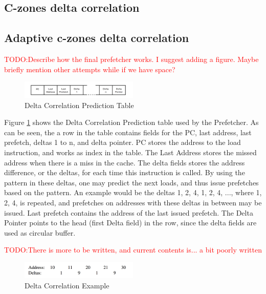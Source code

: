 \documentclass[a4paper]{IEEEtran}
\newcommand\TODO[1]{\textcolor{red}{TODO:#1}}
\newcommand\todo[1]{\TODO{#1}}
\begin{document}
\subsection{C-zones delta correlation}

\subsection{Adaptive c-zones delta correlation}

\todo{Describe how the final prefetcher works. I suggest adding a figure. Maybe briefly mention other attempts while if we have space?}

\begin{figure}[h!]
  \centering
      \includegraphics[width=0.5\textwidth]{Figures/DCTable}
  \caption{Delta Correlation Prediction Table}
  \label{fig:DCTable}
\end{figure}

Figure \ref{fig:DCTable} shows the Delta Correlation Prediction table used by the Prefetcher.
As can be seen, the a row in the table contains fields for the PC, last address, last prefetch, deltas 1 to n, and delta pointer.
PC stores the address to the load instruction, and works as index in the table.
The Last Address stores the missed address when there is a miss in the cache.
The delta fields stores the address difference, or the deltas, for each time this instruction is called.
By using the pattern in these deltas, one may predict the next loads, and thus issue prefetches based on the pattern.
An example would be the deltas 1, 2, 4, 1, 2, 4, ..., where 1, 2, 4, is repeated, and prefetches on addresses with these deltas in between may be issued.
Last prefetch contains the address of the last issued prefetch.
The Delta Pointer points to the head (first Delta field) in the row, since the delta fields are used as circular buffer.

\todo{There is more to be written, and current contents is... a bit poorly written}

\begin{figure}[h!]
  \centering
      \includegraphics[width=0.5\textwidth]{Figures/DCExample}
  \caption{Delta Correlation Example}
  \label{fig:DCExample}
\end{figure}
\end{document}
